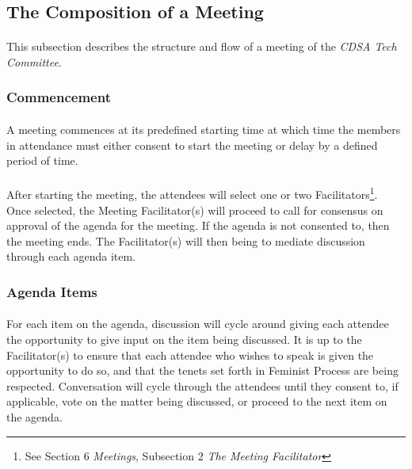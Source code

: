 \documentclass[12pt,letter,twocolumn,oneside,draft]{article}
\newcommand{\cname}{\emph{CDSA Tech Committee}}
\begin{document}
\subsection{The Composition of a Meeting}

\paragraph{}
This subsection describes the structure and flow of a meeting of the \cname{}.

\subsubsection{Commencement}

\paragraph{}
A meeting commences at its predefined starting time at which time the members
in attendance must either consent to start the meeting or delay by a defined period of
time. 

\paragraph{}
After starting the meeting, the attendees will select one or two
Facilitators\footnote{See Section 6 \emph{Meetings}, Subsection 2 \emph{The
Meeting Facilitator}}. Once selected, the Meeting Facilitator(s) will proceed
to call for consensus on approval of the agenda for the meeting. If the agenda
is not consented to, then the meeting ends. The Facilitator(s) will then being
to mediate discussion through each agenda item.

\subsubsection{Agenda Items}

\paragraph{}
For each item on the agenda, discussion will cycle around giving each attendee
the opportunity to give input on the item being discussed. It is up to the
Facilitator(s) to ensure that each attendee who wishes to speak is given the
opportunity to do so, and that the tenets set forth in Feminist Process are
being respected. Conversation will cycle through the attendees until they
consent to, if applicable, vote on the matter being discussed, or proceed to
the next item on the agenda.
\end{document}
